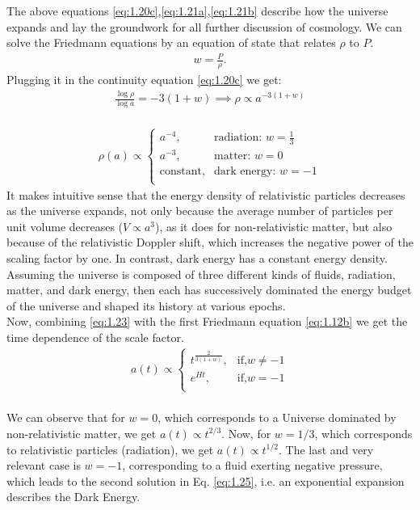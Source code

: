 \hspace{0.5cm}The above equations \eqref{eq:1.20c},\eqref{eq:1.21a},\eqref{eq:1.21b} describe how the universe expands and lay the groundwork for all further discussion of cosmology.
We can solve the Friedmann equations by an equation of state that relates $\rho$ to $P$. 
\begin{align}
    w = \frac{P}{\rho} . 
\end{align}
Plugging it in the continuity equation \eqref{eq:1.20c} we get:
\begin{align}
    \frac{ \log \rho}{ \log a} = {-3(1 + w)} \implies \rho \propto a^{-3(1 + w)}\label{eq:1.23} 
\end{align}\\

\begin{align}
    \rho(a) \propto 
    \begin{cases}
        a^{-4} ,& \text{radiation: }  w =\frac{1}{3}\\
        a^{-3},              & \text{matter: }  w = 0\\
        \text{constant},              & \text{dark energy: }  w = -1\\
    \end{cases}\label{eq:1.24}
\end{align}
It makes intuitive sense that the energy density of relativistic particles decreases as the universe expands, not only because the average number of particles per unit volume decreases ($V \propto a^3$), as it does for non-relativistic matter, but also because of the relativistic Doppler shift, which increases the negative power of the scaling factor by one. 
In contrast, dark energy has a constant energy density. 
Assuming the universe is composed of three different kinds of fluids, radiation, matter, and dark energy, then each has successively dominated the energy budget of the universe and shaped its history at various epochs.\\
Now, combining \eqref{eq:1.23} with the first Friedmann equation \eqref{eq:1.12b} we get the time dependence of the scale factor.
\begin{align}
    a(t) \propto 
    \begin{cases}
        t^{\frac{2}{3(1+w)}} ,& \text{if,}  w\neq -1\\
        e^{Ht},               & \text{if,}  w = -1\\
    \end{cases}\label{eq:1.25}
\end{align}\\
We can observe that for $w = 0$, which corresponds to a Universe dominated by non-relativistic matter, we get $a(t) \propto  t^{2/3}$. 
Now, for $w = 1/3$, which corresponds to relativistic particles (radiation), we get $a(t) \propto  t^{1/2}$. 
The last and very relevant case is $w = -1$, corresponding to a fluid exerting negative pressure, which leads to the second solution in Eq. \eqref{eq:1.25}, i.e. an exponential expansion describes the Dark Energy.



